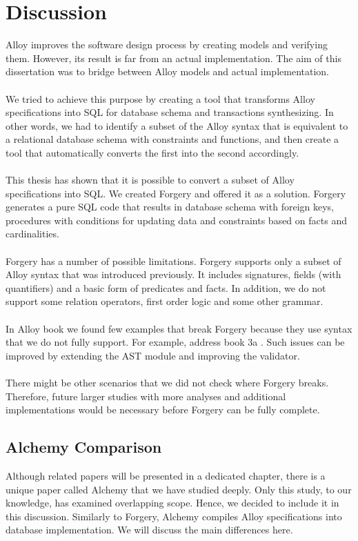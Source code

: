 \documentclass[oneside]{book}
\begin{document}
\section{Discussion}
Alloy improves the software design process by creating models and verifying them. However, its result is far from an actual implementation. The aim of this dissertation was to bridge between Alloy models and actual implementation. 
\\\\
We tried to achieve this purpose by creating a tool that  transforms Alloy specifications into SQL for database schema and transactions synthesizing. In other words, we had to identify a subset of the Alloy syntax that is equivalent to a relational database schema with constraints and functions, and then create a tool that automatically converts the first into the second accordingly.
\\\\
This thesis has shown that it is possible to convert a subset of Alloy specifications into SQL. We created Forgery and offered it as a solution. Forgery generates a pure SQL code that results in database schema with foreign keys, procedures with conditions for updating data and constraints based on facts and cardinalities.
\\\\
Forgery has a number of possible limitations. Forgery supports only a subset of Alloy syntax that was introduced previously. It includes signatures, fields (with quantifiers) and a basic form of predicates and facts. In addition, we do not support some relation operators, first order logic and some other grammar. 
\\\\
In Alloy book we found few examples that break Forgery because they use syntax that we do not fully support. For example, address book 3a \cite[p. ~25]{abstractions}. Such issues can be improved by extending the AST module and improving the validator.
\\\\
There might be other scenarios that we did not check where Forgery breaks. Therefore, future larger studies with more analyses and additional implementations would be necessary before Forgery can be fully complete.

\subsection{Alchemy Comparison}
Although related papers will be presented in a dedicated chapter, there is a unique paper called Alchemy \cite{alchemy} that we 
have studied deeply. Only this study, to our knowledge, has examined overlapping scope. Hence, we decided to include it in this discussion. Similarly to Forgery, Alchemy compiles Alloy specifications into database implementation. We will discuss the main differences here.
\end{document}
